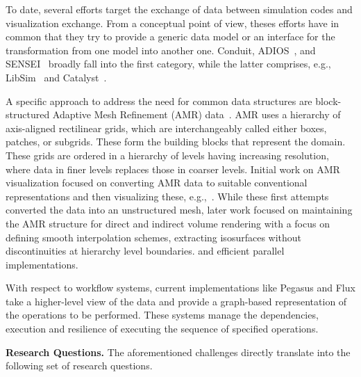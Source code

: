 To date, several efforts target the exchange of data between simulation codes and visualization exchange.
From a conceptual point of view, theses efforts have in common that they try to provide a generic data model or an interface for the transformation from one model into another one.
Conduit\cite{Conduit}, ADIOS~\cite{ADIOS}, and SENSEI~\cite{SENSEI} broadly fall into the first category, while the latter comprises, e.g., LibSim~\cite{LibSim} and Catalyst~\cite{Catalyst}.

A specific approach to address the need for common data structures are block-structured Adaptive Mesh Refinement (AMR) data~\cite{Berger1989}. 
AMR uses a hierarchy of axis-aligned rectilinear grids, which are interchangeably called either boxes, patches, or subgrids. 
These form the building blocks that represent the domain. These grids are ordered in a hierarchy of levels having increasing resolution, where data in finer levels replaces those in coarser levels. 
Initial work on AMR visualization focused on converting AMR data to suitable conventional representations and then visualizing these, e.g.,~\cite{Norman1999}.
While these first attempts converted the data into an unstructured mesh, later work focused on maintaining the AMR structure for direct and indirect volume rendering \cite{Wald2017, Wang2018, Weber2012} with a focus on defining smooth interpolation schemes, extracting isosurfaces without discontinuities at hierarchy level boundaries. and efficient parallel implementations.

With respect to workflow systems, current implementations like Pegasus and Flux take a higher-level view of the data and provide a graph-based representation of the operations to be performed. These systems manage the dependencies, execution and resilience of executing the sequence of specified operations.

\medskip\noindent
\textbf{\sffamily Research Questions.} 
The aforementioned challenges directly translate into the following set of research questions.

